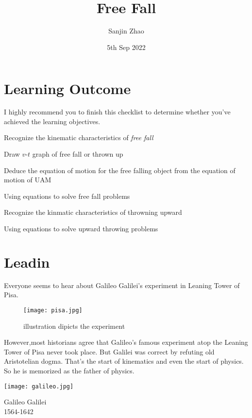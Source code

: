 \documentclass[a4paper]{tufte-handout}
\title{Free Fall}
\author{Sanjin Zhao}
\date{5th Sep 2022}  %
\begin{document}
\maketitle%
\section*{Learning Outcome}
I highly recommend you to finish this checklist to determine whether you've achieved the learning objectives.
\begin{todolist}
  \item Recognize the kinematic characteristics of \emph{free fall}
  \item Draw $v$-$t$ graph of free fall or thrown up
  \item Deduce the equation of motion for the free falling object from the equation of motion of UAM
  \item Using equations to solve free fall problems
  \item Recognize the kinmatic characteristics of throwning upward
  \item Using equations to solve upward throwing problems
\end{todolist}
\clearpage

\section{Leadin}
Everyone seems to hear about Galileo Galilei's experiment in Leaning Tower of Pisa.
\begin{figure}[h]
\texttt{[image: pisa.jpg]}
\caption{illustration dipicts the experiment}
\end{figure}
However,most historians agree that Galileo's famous experiment atop the Leaning Tower of Pisa never took place. But Galilei was correct by refuting old Aristotelian dogma. That's the start of kinematics and even the start of physics. So he is memorized as the father of physics.
\begin{marginfigure}
\texttt{[image: galileo.jpg]}
\caption{Galileo Galilei\\1564-1642}
\end{marginfigure} 
\end{document}
